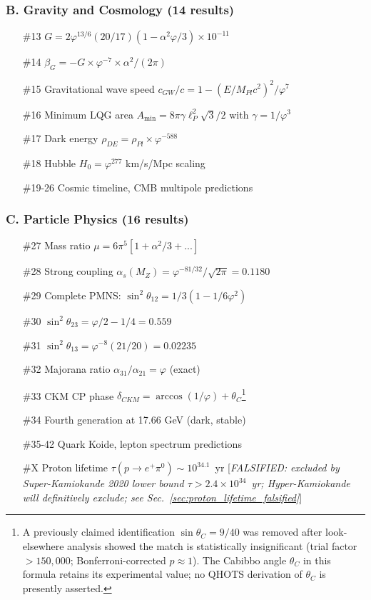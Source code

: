 \documentclass[aps,prd,twocolumn,superscriptaddress,floatfix,nofootinbib]{revtex4-2}
\theoremstyle{definition}
\theoremstyle{remark}
\newcommand{\vp}{\varphi}
\begin{document}
\subsubsection{B. Gravity and Cosmology (14 results)}

\begin{enumerate}
\item[\#13] $G = 2\vp^{13/6}(20/17)(1-\alpha^2\vp/3) \times 10^{-11}$
\item[\#14] $\beta_G = -G \times \vp^{-7} \times \alpha^2/(2\pi)$
\item[\#15] Gravitational wave speed $c_{GW}/c = 1 - (E/M_{Pl}c^2)^2/\vp^7$
\item[\#16] Minimum LQG area $A_{\min} = 8\pi\gamma\ell_P^2\sqrt{3}/2$ with $\gamma = 1/\vp^3$
\item[\#17] Dark energy $\rho_{DE} = \rho_{Pl} \times \vp^{-588}$
\item[\#18] Hubble $H_0 = \vp^{277}$ km/s/Mpc scaling
\item[\#19-26] Cosmic timeline, CMB multipole predictions
\end{enumerate}

\subsubsection{C. Particle Physics (16 results)}

\begin{enumerate}
\item[\#27] Mass ratio $\mu = 6\pi^5[1 + \alpha^2/3 + ...]$
\item[\#28] Strong coupling $\alpha_s(M_Z) = \vp^{-81/32}/\sqrt{2\pi} = 0.1180$
\item[\#29] Complete PMNS: $\sin^2\theta_{12} = 1/3(1-1/6\vp^2)$
\item[\#30] $\sin^2\theta_{23} = \vp/2 - 1/4 = 0.559$
\item[\#31] $\sin^2\theta_{13} = \vp^{-8}(21/20) = 0.02235$
\item[\#32] Majorana ratio $\alpha_{31}/\alpha_{21} = \vp$ (exact)
\item[\#33] CKM CP phase $\delta_{CKM} = \arccos(1/\vp) + \theta_C$\footnote{A previously
claimed identification $\sin\theta_C = 9/40$ was removed after look-elsewhere analysis
showed the match is statistically insignificant (trial factor $> 150{,}000$; Bonferroni-corrected
$p \approx 1$). The Cabibbo angle $\theta_C$ in this formula retains its experimental value;
no QHOTS derivation of $\theta_C$ is presently asserted.}
\item[\#34] Fourth generation at 17.66 GeV (dark, stable)
\item[\#35-42] Quark Koide, lepton spectrum predictions
\item[\#X] Proton lifetime $\tau(p \to e^+\pi^0) \sim 10^{34.1}$~yr [\textit{FALSIFIED: excluded
  by Super-Kamiokande 2020 lower bound $\tau > 2.4 \times 10^{34}$~yr; Hyper-Kamiokande will
  definitively exclude; see Sec.~\ref{sec:proton_lifetime_falsified}}]
\end{enumerate}
\end{document}
